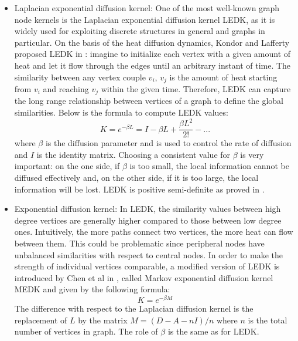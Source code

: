 \documentclass[review]{elsarticle}
\begin{document}
\begin{itemize}


\item Laplacian exponential diffusion kernel: One of the most well-known graph node kernels is the Laplacian exponential diffusion kernel LEDK, as it is widely used for exploiting discrete structures in general and graphs in particular. On the basis of the heat diffusion dynamics, Kondor and Lafferty proposed LEDK in \cite{kondor2002diffusion}: imagine to initialize each vertex with a given amount of heat and let it flow through the edges until an arbitrary instant of time. The similarity between any vertex couple $v_{i}$, $v_{j}$ is the amount of heat starting from $v_{i}$ and reaching $v_{j}$ within the given time. Therefore, LEDK can capture the long range relationship between vertices of a graph to define the global similarities. Below is the formula to compute LEDK values:
\begin{equation} 
\label{LEDK-formula}
K = e^{-\beta L} = I - \beta L + \frac{\beta L^{2}}{2!} - ...
\end{equation}
where $\beta$ is the diffusion parameter and is used to control the rate of diffusion and $I$ is the identity matrix. Choosing a consistent value for $\beta$ is very important: on the one side, if $\beta$ is too small, the local information cannot be diffused effectively and, on the other side, if it is too large, the local information will be lost. LEDK is positive semi-definite as proved in \cite{kondor2002diffusion}.

\item Exponential diffusion kernel: In LEDK, the similarity values between high degree vertices are generally higher compared to those between low degree ones. Intuitively, the more paths connect two vertices, the more heat can flow between them. This could be problematic since peripheral nodes have unbalanced similarities with respect to central nodes. In order to make the strength of individual vertices comparable, a modified version of LEDK is introduced by Chen et al in \cite{chen2014disease}, called Markov exponential diffusion kernel MEDK and given by the following formula:
\begin{equation} \label{MEDK-formula}
K = e^{-\beta M}
\end{equation}
The difference with respect to the Laplacian diffusion kernel is the replacement of $L$ by the matrix $M=(D-A-nI)/n$ where $n$ is the total number of vertices in graph. The role of $\beta$ is the same as for LEDK.


\end{itemize}
\end{document}
